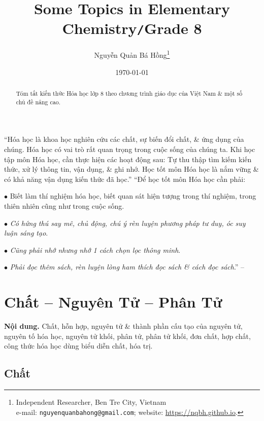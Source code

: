 \documentclass{article}
\title{Some Topics in Elementary Chemistry\texttt{/}Grade 8}
\author{Nguyễn Quản Bá Hồng\footnote{Independent Researcher, Ben Tre City, Vietnam\\e-mail: \texttt{nguyenquanbahong@gmail.com}; website: \url{https://nqbh.github.io}.}}
\date{\today}
\numberwithin{equation}{section}
\begin{document}
\maketitle
\begin{abstract}
	Tóm tắt kiến thức Hóa học lớp 8 theo chương trình giáo dục của Việt Nam \& một số chủ đề nâng cao.
\end{abstract}
\setcounter{secnumdepth}{4}
\setcounter{tocdepth}{3}
\tableofcontents
\newpage


``Hóa học là khoa học nghiên cứu các chất, sự biến đổi chất, \& ứng dụng của chúng. Hóa học có vai trò rất quan trọng trong cuộc sống của chúng ta. Khi học tập môn Hóa học, cần thực hiện các hoạt động sau: Tự thu thập tìm kiếm kiến thức, xử lý thông tin, vận dụng, \& ghi nhớ. Học tốt môn Hóa học là nắm vững \& có khả năng vận dụng kiến thức đã học.'' ``Để học tốt môn Hóa học cần phải:
\begin{enumerate*}
	\item[$\bullet$] Biết làm thí nghiệm hóa học, biết quan sát hiện tượng trong thí nghiệm, trong thiên nhiên cũng như trong cuộc sống.
	\item[$\bullet$] \textit{Có hứng thú say mê, chủ động, chú ý rèn luyện phương pháp tư duy, óc suy luận sáng tạo}.
	\item[$\bullet$] \textit{Cũng phải nhớ nhưng nhớ 1 cách chọn lọc thông minh}.
	\item[$\bullet$] \textit{Phải đọc thêm sách, rèn luyện lòng ham thích đọc sách \& cách đọc sách}.'' -- \cite[p. 5]{SGK_Hoa_Hoc_8}
\end{enumerate*}

\section{Chất -- Nguyên Tử -- Phân Tử}
\textsf{\textbf{Nội dung.} Chất, hỗn hợp, nguyên tử \& thành phần cấu tạo của nguyên tử, nguyên tố hóa học, nguyên tử khối, phân tử, phân tử khối, đơn chất, hợp chất, công thức hóa học dùng biểu diễn chất, hóa trị.}

\subsection{Chất}
\end{document}
